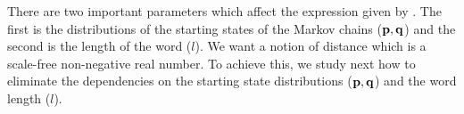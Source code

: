 There are two important parameters which affect the expression given by \cite{Kazakos78}. The first is the distributions of the starting states of the Markov chains ($\mathbf{p}, \mathbf{q}$) and 
the second is the length of the word ($l$). We want a notion of distance which is a scale-free non-negative real number. To achieve this, we study next how to eliminate 
the dependencies on the starting state distributions ($\mathbf{p},\mathbf{q}$) and the word length ($l$).
